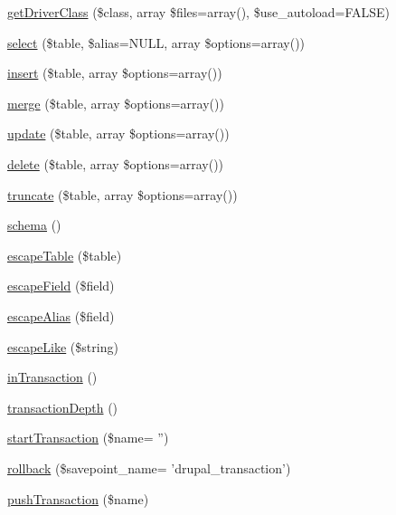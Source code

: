 \begin{DoxyCompactItemize}
\item 
\hyperlink{classDatabaseConnection_a13497769ca9329dc4a62ad51b66566d4}{getDriverClass} (\$class, array \$files=array(), \$use\_\-autoload=FALSE)
\item 
\hyperlink{classDatabaseConnection_a31f271cf685087c1a45a0cf74bb2b73e}{select} (\$table, \$alias=NULL, array \$options=array())
\item 
\hyperlink{classDatabaseConnection_aa979bc386e0457a0cb989d762da5afde}{insert} (\$table, array \$options=array())
\item 
\hyperlink{classDatabaseConnection_ada81b5e7e2aa5f9741dc88474a917cff}{merge} (\$table, array \$options=array())
\item 
\hyperlink{classDatabaseConnection_a4c2fb58226e7045cc9f8a6b2edac630e}{update} (\$table, array \$options=array())
\item 
\hyperlink{classDatabaseConnection_af8bf777ee824d3c2c5a3e18e5941ece4}{delete} (\$table, array \$options=array())
\item 
\hyperlink{classDatabaseConnection_a24e86882227b5b337daedcf20458e371}{truncate} (\$table, array \$options=array())
\item 
\hyperlink{classDatabaseConnection_a809aee6bbab9d383927be8f307b7ef7b}{schema} ()
\item 
\hyperlink{classDatabaseConnection_a4ea565fbd6c6d1f258594b23a2e10e20}{escapeTable} (\$table)
\item 
\hyperlink{classDatabaseConnection_aae6a7cba6988731b2b84d645ea4de11c}{escapeField} (\$field)
\item 
\hyperlink{classDatabaseConnection_a400fea30d60f9477eb176d9fee36cfe2}{escapeAlias} (\$field)
\item 
\hyperlink{classDatabaseConnection_a048eda663834d6303ce3e3d0fabc7e75}{escapeLike} (\$string)
\item 
\hyperlink{classDatabaseConnection_ac1ff742bc653f3d67d633c3d1b256229}{inTransaction} ()
\item 
\hyperlink{classDatabaseConnection_a6b2631c56f4951032f30a7c519a4837e}{transactionDepth} ()
\item 
\hyperlink{classDatabaseConnection_a210f69060d31ab1559a8b2231e83a318}{startTransaction} (\$name= '')
\item 
\hyperlink{classDatabaseConnection_aef0f8cd6cbfbc304e721baaa14be14cf}{rollback} (\$savepoint\_\-name= 'drupal\_\-transaction')
\item 
\hyperlink{classDatabaseConnection_a3aa9a595dd90a2b64d6b6c187f25828a}{pushTransaction} (\$name)
\item 

\end{DoxyCompactItemize}

